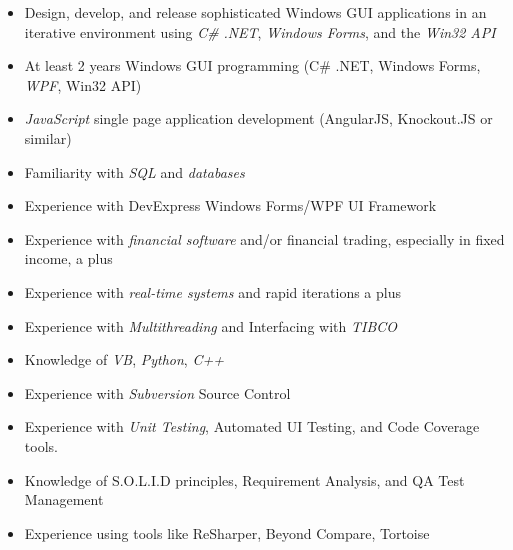 \begin{framed}\noindent
\begin{itemize}[nosep]
\item Design, develop, and release sophisticated Windows GUI applications in an iterative environment using \emph{C\#} \emph{.NET}, \emph{Windows Forms}, and the \emph{Win32 API}
\item At least 2 years Windows GUI programming (C\# .NET, Windows Forms, \emph{WPF}, Win32 API)
\item \emph{JavaScript} single page application development (AngularJS, Knockout.JS or similar)
\item Familiarity with \emph{SQL} and \emph{databases}
\item Experience with DevExpress Windows Forms/WPF  UI Framework
\item Experience with \emph{financial software} and/or financial trading, especially in fixed income, a plus
\item Experience with \emph{real-time systems} and rapid iterations a plus
\item Experience with \emph{Multithreading} and Interfacing with \emph{TIBCO}
\item Knowledge of \emph{VB}, \emph{Python}, \emph{C++}
\item Experience with \emph{Subversion} Source Control
\item Experience with \emph{Unit Testing}, Automated UI Testing, and Code Coverage tools.
\item Knowledge of S.O.L.I.D principles, Requirement Analysis, and QA Test Management
\item Experience using tools like ReSharper, Beyond Compare,  Tortoise
\end{itemize}
\end{framed}

